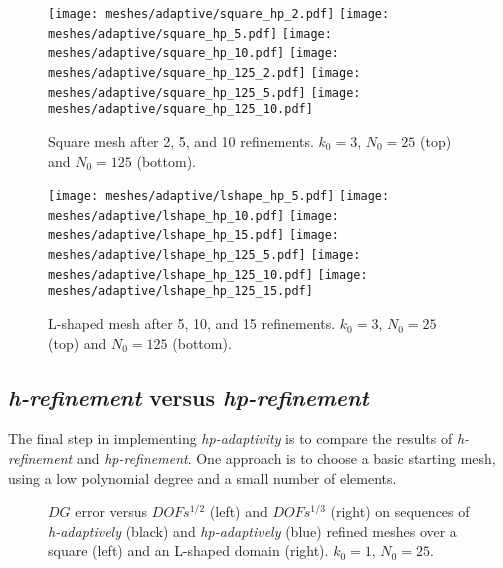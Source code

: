 \newpage

\begin{figure}[!ht]
	\centering
    \texttt{[image: meshes/adaptive/square\_hp\_2.pdf]}
	\texttt{[image: meshes/adaptive/square\_hp\_5.pdf]}
	\texttt{[image: meshes/adaptive/square\_hp\_10.pdf]}
    \texttt{[image: meshes/adaptive/square\_hp\_125\_2.pdf]}
	\texttt{[image: meshes/adaptive/square\_hp\_125\_5.pdf]}
	\texttt{[image: meshes/adaptive/square\_hp\_125\_10.pdf]}
	\caption{Square mesh after 2, 5, and 10 refinements. $k_0 = 3$, $N_0 = 25$ (top) and $N_0 = 125$ (bottom).}
\end{figure}

\begin{figure}[!ht]
	\centering
	\texttt{[image: meshes/adaptive/lshape\_hp\_5.pdf]}
	\texttt{[image: meshes/adaptive/lshape\_hp\_10.pdf]}
	\texttt{[image: meshes/adaptive/lshape\_hp\_15.pdf]}
    \texttt{[image: meshes/adaptive/lshape\_hp\_125\_5.pdf]}
	\texttt{[image: meshes/adaptive/lshape\_hp\_125\_10.pdf]}
	\texttt{[image: meshes/adaptive/lshape\_hp\_125\_15.pdf]}
	\caption{L-shaped mesh after 5, 10, and 15 refinements. $k_0 = 3$, $N_0 = 25$ (top) and $N_0 = 125$ (bottom).}
\end{figure}

\newpage
\subsection{\textit{h-refinement} versus \textit{hp-refinement}}

The final step in implementing \textit{hp-adaptivity} is to compare the results of \textit{h-refinement} and \textit{hp-refinement}. One approach is to choose a basic starting mesh, using a low polynomial degree and a small number of elements.

\begin{figure}[!ht]
    \begin{subfigure}[b]{0.45\textwidth}
		
	\end{subfigure}
	\hfill
	\begin{subfigure}[b]{0.45\textwidth}
		
	\end{subfigure}
    \caption{$DG$ error versus $DOFs^{1/2}$ (left) and $DOFs^{1/3}$ (right) on sequences of \textit{h-adaptively} (black) and \textit{hp-adaptively} (blue) refined meshes over a square (left) and an L-shaped domain (right). $k_0 = 1$, $N_0 = 25$.}
\end{figure}


